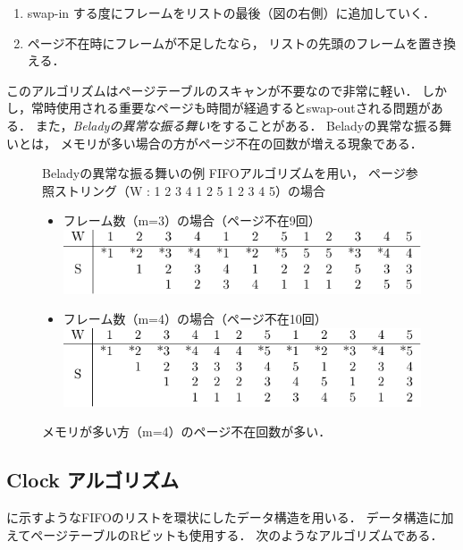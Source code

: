 \begin{enumerate}
\item swap-in する度にフレームをリストの最後（図の右側）に追加していく．
\item ページ不在時にフレームが不足したなら，
  リストの先頭のフレームを置き換える．
\end{enumerate}

このアルゴリズムはページテーブルのスキャンが不要なので非常に軽い．
しかし，常時使用される重要なページも時間が経過するとswap-outされる問題がある．
また，\emph{Beladyの異常な振る舞い}をすることがある．
Beladyの異常な振る舞いとは，
メモリが多い場合の方がページ不在の回数が増える現象である．

\begin{figure}[btp]
  \begin{itembox}[l]{Beladyの異常な振る舞いの例}
    FIFOアルゴリズムを用い，
    ページ参照ストリング（W : 1 2 3 4 1 2 5 1 2 3 4 5）の場合
    \begin{itemize}
    \item フレーム数（m=3）の場合（ページ不在9回）\\
      \includegraphics[scale=1.0]{Tbl/beladyAnomalyM3.pdf}
    \item フレーム数（m=4）の場合（ページ不在10回）\\
      \includegraphics[scale=1.0]{Tbl/beladyAnomalyM4.pdf}
    \end{itemize}
    メモリが多い方（m=4）のページ不在回数が多い．
  \end{itembox}
\end{figure}

\subsection{Clock アルゴリズム}
に示すようなFIFOのリストを環状にしたデータ構造を用いる．
データ構造に加えてページテーブルのRビットも使用する．
次のようなアルゴリズムである．

